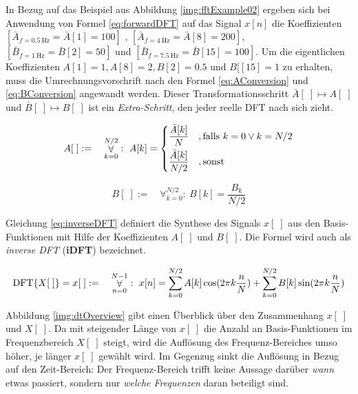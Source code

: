In Bezug auf das Beispiel aus Abbildung \ref{img:fftExample02} ergeben sich bei Anwendung von Formel \ref{eq:forwardDFT} auf das Signal $x[n]$ die Koeffizienten $[ \bar{A}_{f=\SI{0.5}{\hertz}} = \bar{A}[1] = 100 ]$ , $[  \bar{A}_{f=\SI{4}{\hertz}} = \bar{A}[8] = 200 ]$, $[ \bar{B}_{f=\SI{1}{\hertz}} = \bar{B}[2] = 50 ]$ und $[ \bar{B}_{f=\SI{7.5}{\hertz}} = \bar{B}[15] = 100 ]$. Um die eigentlichen Koeffizienten $A[1] = 1, A[8] = 2, B[2] = 0.5$ und $B[[15] = 1$ zu erhalten, muss die Umrechnungsvorschrift nach den Formel \ref{eq:AConversion} und \ref{eq:BConversion} angewandt werden. Dieser Transformationsschritt $\bar{A}[\;] \longmapsto  A[\;]$ und $\bar{B}[\;] \longmapsto  B[\;]$ ist ein \emph{Extra-Schritt}, den jeder reelle DFT nach sich zieht. \cite[S. 152 - 153]{dspGuide}

\begin{equation}
A[\;] := \quad \mathop{\forall}_{k = 0}^{N/2} :\ A[k] = 
\begin{dcases}
\frac{\bar{A}[k]}{N} \quad, \text{falls } k = 0 \vee k = N/2\\
\frac{\bar{A}[k]}{N/2} \quad ,\text{sonst} \\
\end{dcases}
\label{eq:AConversion}
\end{equation}

\begin{equation}
B[\;] := \quad \mathop{\forall}_{k = 0}^{N/2} :\
B[k]= \frac{B_k}{N/2}
\label{eq:BConversion}
\end{equation}

Gleichung \ref{eq:inverseDFT} definiert die Synthese des Signals $x[\;]$ aus den Basis-Funktionen mit Hilfe der Koeffizienten $A[\;]$ und $B[\;]$. Die Formel wird auch als \emph{inverse DFT} (\textbf{iDFT}) bezeichnet. \cite[S. 152 - 153]{dspGuide}

\begin{equation}
\text{DFT}\{X[\;]\} = x[\;]
:= \quad \mathop{\forall}_{n = 0}^{N-1} :\ x[n] = \sum_{k = 0}^{N/2} A[k]\cos(2\pi k \frac{n}{N}) + \sum_{k = 0}^{N/2}B[k]\sin(2\pi k \frac{n}{N}) \\
\label{eq:inverseDFT}
\end{equation}

Abbildung \ref{img:dtOverview} gibt einen Überblick über den Zusammenhang $x[\;]$ und $X[\;]$. Da mit steigender Länge von $x[\;]$ die Anzahl an Basis-Funktionen im Frequenzbereich $X[\;]$ steigt, wird die Auflösung des Frequenz-Bereiches umso höher, je länger $x[\;]$ gewählt wird. Im Gegenzug sinkt die Auflösung in Bezug auf den Zeit-Bereich: Der Frequenz-Bereich trifft keine Aussage darüber \emph{wann} etwas passiert, sondern nur \emph{welche Frequenzen} daran beteiligt sind.\cite[S. 170]{dspGuide}

